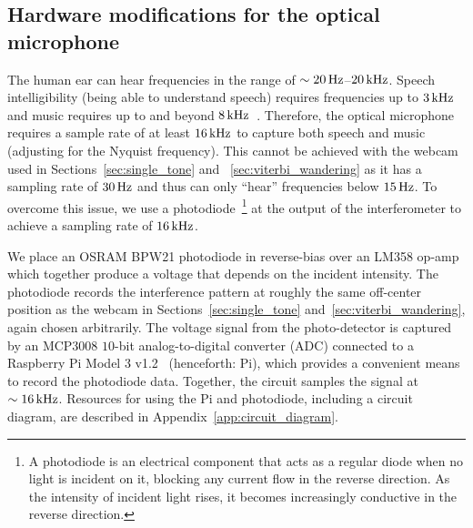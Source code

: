 \documentclass[paper-main.tex]{subfiles}
\begin{document}
\subsection{Hardware modifications for the optical microphone}
\label{sec:photodiode}
The human ear can hear frequencies in the range of $\sim 20\,{\rm Hz}$--$20\,{\rm kHz}$. 
Speech intelligibility (being able to understand speech) requires frequencies up to $3\,{\rm kHz}$ and music requires up to and beyond $8\,{\rm kHz}$~\cite{speech_intelligibility}. Therefore, the optical microphone requires a sample rate of at least $16\,{\rm kHz}$ to capture both speech and music (adjusting for the Nyquist frequency). 
This cannot be achieved with the webcam used in Sections~\ref{sec:single_tone} and ~\ref{sec:viterbi_wandering} as it has a sampling rate of $30\,{\rm Hz}$ and thus can only ``hear'' frequencies below $15\,{\rm Hz}$.
To overcome this issue, we use a photodiode~\footnote{A photodiode is an electrical component that acts as a regular diode when no light is incident on it, blocking any current flow in the reverse direction. As the intensity of incident light rises, it becomes increasingly conductive in the reverse direction.} at the output of the interferometer to achieve a sampling rate of $16\,{\rm kHz}$.

We place an OSRAM BPW21 photodiode in reverse-bias over an LM358 op-amp which together produce a voltage that depends on the incident intensity. 
The photodiode records the interference pattern at roughly the same off-center position as the webcam in Sections~\ref{sec:single_tone} and~\ref{sec:viterbi_wandering}, again chosen arbitrarily.
The voltage signal from the photo-detector is captured by an MCP3008 $10$-bit analog-to-digital converter (ADC) connected to a Raspberry Pi Model 3 v1.2~\cite{RaspberryPi:online} (henceforth: Pi), which provides a convenient means to record the photodiode data.
Together, the circuit samples the signal at $\sim 16\,{\rm kHz}$. 
Resources for using the Pi and photodiode, including a circuit diagram, are described in Appendix~\ref{app:circuit_diagram}.
\end{document}
